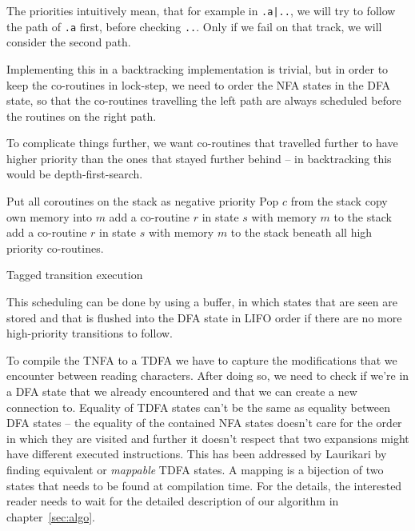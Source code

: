 \documentclass[11pt,a4paper,twoside,openright]{Thesis}
\theoremstyle{definition}
\begin{document}
The priorities intuitively mean, that for example in \texttt{.a|..}, we will
try to follow the path of \texttt{.a} first, before checking \texttt{..}.
Only if we fail on that track, we will consider the second path.

Implementing this in a backtracking implementation is trivial, but in order
to keep the co-routines in lock-step, we need to order the NFA states in the
DFA state, so that the co-routines travelling the left path are always
scheduled before the routines on the right path.

To complicate things further, we want co-routines that travelled further to 
have higher priority than the ones that stayed further behind -- in 
backtracking this would be depth-first-search.

\begin{algorithm*}
  \begin{algorithmic}
    \State Put all coroutines on the stack as negative priority
      \State Pop $c$ from the stack
          \State copy own memory into $m$
          \State {}
        \EndIf
          \State add a co-routine $r$ in state $s$ with memory $m$ to the stack
        \Else
          \State add a co-routine $r$ in state $s$ with memory $m$ to the 
          stack beneath all high priority co-routines.
        \EndIf
      \EndFor
    \EndWhile
  \EndFunction
  \end{algorithmic}
  \caption{\label{alg:coroutine-tagged}Tagged transition execution}
\end{algorithm*}

This scheduling can be done by using a buffer, in which states that are seen 
are stored and that is flushed into the DFA state in LIFO order if there are no
more high-priority transitions to follow.

To compile the TNFA to a TDFA we have to capture the modifications that we 
encounter between reading characters. After doing so, we need to check if 
we're in a DFA state that we already encountered and that we can create a new 
connection to. Equality of TDFA states can't be the same as equality between 
DFA states -- the equality of the contained NFA states doesn't care for the 
order in which they are visited and further it doesn't respect that two 
expansions might have different executed instructions. This has been addressed
by Laurikari\cite{Laur00a} by finding equivalent or \emph{mappable} TDFA
states. A mapping is a bijection of two states that needs to be found at
compilation time. For the details, the interested reader needs to wait for the
detailed description of our algorithm in chapter~\ref{sec:algo}.
\end{document}

